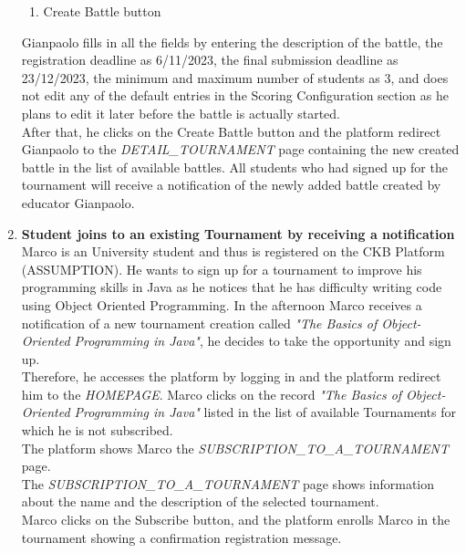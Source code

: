 \begin{enumerate}
\begin{enumerate}
		      \item Create Battle button
	      \end{enumerate}

	      Gianpaolo fills in all the fields by entering the description of the battle, the registration deadline as 6/11/2023, the final submission deadline as 23/12/2023, the minimum
	      and maximum number of students as 3, and does not edit any of the default entries in the Scoring Configuration section as he plans to edit it later before the battle is
	      actually started.\\
	      After that, he clicks on the Create Battle button and the platform redirect Gianpaolo to the \emph{DETAIL\_TOURNAMENT} page containing the new created battle in the list of available battles.
	      All students who had signed up for the tournament will receive a notification of the newly added battle created by educator Gianpaolo.



	\item \textbf{Student joins to an existing Tournament by receiving a notification}\\
	      Marco is an University student and thus is registered on the CKB Platform (ASSUMPTION). He wants to sign up for a tournament to improve his programming skills in Java as he notices that he has difficulty writing code using Object Oriented Programming. In the afternoon Marco receives a notification of a new tournament creation called \emph{"The Basics of Object-Oriented Programming in Java"}, he decides to take the opportunity and sign up.\\
	      Therefore, he accesses the platform by logging in and the platform redirect him to the \emph{HOMEPAGE}. Marco clicks on the record \emph{"The Basics of Object-Oriented Programming in Java"} listed in the list of available Tournaments for which he is not subscribed.\\
	      The platform shows Marco the \emph{SUBSCRIPTION\_TO\_A\_TOURNAMENT} page.\\
	      The \emph{SUBSCRIPTION\_TO\_A\_TOURNAMENT}  page shows information about the name and the description of the selected tournament. \\
	      Marco clicks on the Subscribe button, and the platform enrolls Marco in the tournament showing a confirmation registration message.


\end{enumerate}
